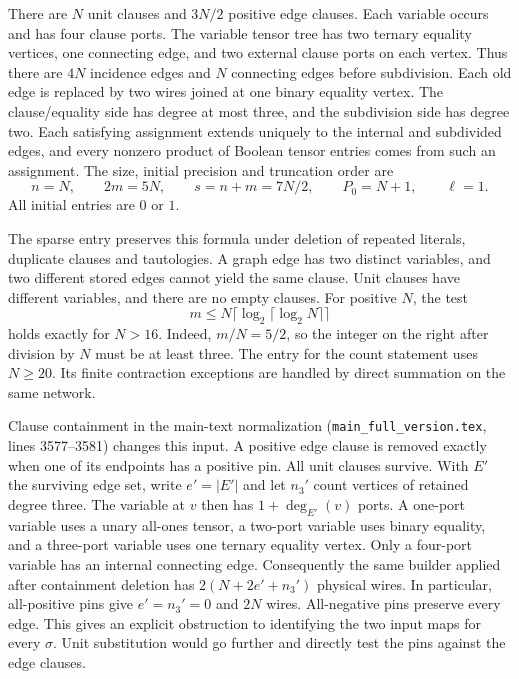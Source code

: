 \documentclass[
  11pt,
]{article}
\newcommand{\ceil}[1]{\lceil #1\rceil}
\begin{document}
There are \(N\) unit clauses and \(3N/2\) positive edge clauses. Each
variable occurs and has four clause ports. The variable tensor tree
has two ternary equality vertices, one connecting edge, and two
external clause ports on each vertex. Thus there are \(4N\) incidence
edges and \(N\) connecting edges before subdivision. Each old edge is
replaced by two wires joined at one binary equality vertex. The
clause/equality side has degree at most three, and the subdivision
side has degree two. Each satisfying assignment extends uniquely to
the internal and subdivided edges, and every nonzero product of
Boolean tensor entries comes from such an assignment. The size,
initial precision and truncation order are
\[
              n=N,\qquad 2m=5N,\qquad s=n+m=7N/2,\qquad
              P_0=N+1,\qquad \ell=1.
\]
All initial entries are \(0\) or \(1\).

The sparse entry preserves this formula under deletion of repeated
literals, duplicate clauses and tautologies. A graph edge has two
distinct variables, and two different stored edges cannot yield the
same clause. Unit clauses have different variables, and there are no
empty clauses. For positive \(N\), the test
\[
                m\le N\ceil{\log_2\ceil{\log_2 N}}
\]
holds exactly for \(N>16\). Indeed, \(m/N=5/2\), so the integer on the
right after division by \(N\) must be at least three. The entry for the
count statement uses \(N\ge20\). Its finite contraction exceptions are
handled by direct summation on the same network.

Clause containment in the main-text normalization
(\texttt{main\_full\_version.tex}, lines 3577--3581) changes this input.
A positive edge clause is removed exactly when one of its endpoints
has a positive pin. All unit clauses survive. With \(E'\) the surviving
edge set, write \(e'=|E'|\) and let \(n_3'\) count vertices of retained
degree three. The variable at \(v\) then has \(1+\deg_{E'}(v)\) ports.
A one-port variable uses a unary all-ones tensor, a two-port variable
uses binary equality, and a three-port variable uses one ternary
equality vertex. Only a four-port variable has an internal connecting
edge. Consequently the same builder applied after containment
deletion has \(2(N+2e'+n_3')\) physical wires. In particular,
all-positive pins give \(e'=n_3'=0\) and \(2N\) wires. All-negative pins
preserve every edge. This gives an explicit obstruction to identifying
the two input maps for every \(\sigma\). Unit substitution would go
further and directly test the pins against the edge clauses.
\end{document}
